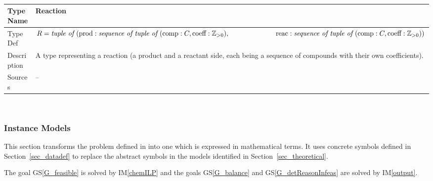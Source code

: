 \documentclass[12pt]{article}
\newcommand*{\posInt}{\mathbb{Z}_{> 0}}
\newcommand{\colAwidth}{0.13\textwidth}
\newcommand{\colBwidth}{0.82\textwidth}
\newcommand{\gsref}[1]{GS\ref{#1}}
\newcommand{\imref}[1]{IM\ref{#1}}
\begin{document}
~\newline
\noindent
\begin{minipage}{\textwidth}
  \renewcommand*{\arraystretch}{1.5}
  \begin{tabular}{| p{\colAwidth} | p{\colBwidth}|}
    \hline
    \rowcolor[gray]{0.9}
    Type Name   & Reaction                                                 \\
    \hline
    Type Def    &
    $R = \textit{tuple of }(
      \text{prod} : \textit{sequence of tuple of }(\text{comp} : C,
      \text{coeff} : \posInt), \newline
      ~\quad\quad\quad\quad\quad\quad\>\,
      \text{reac} : \textit{sequence of tuple of }(\text{comp} : C,
    \text{coeff} : \posInt))$                                              \\
    \hline
    Description & A type representing a reaction (a product and a reactant
    side, each being a sequence of compounds with their own coefficients). \\
    \hline
    Sources     & --                                                       \\
    \hline
  \end{tabular}
\end{minipage}\\

\newpage

\subsubsection{Instance Models} \label{sec_instance}

This section transforms the problem defined in  into
one which is expressed in mathematical terms. It uses concrete symbols defined
in Section~\ref{sec_datadef} to replace the abstract symbols in the models
identified in Section~\ref{sec_theoretical}.

The goal \gsref{G_feasible} is solved by \imref{chemILP} and the goals
\gsref{G_balance} and \gsref{G_detReasonInfeas} are solved by \imref{output}.
\end{document}
